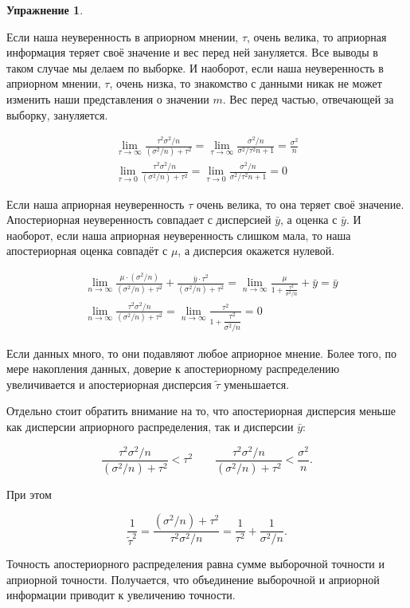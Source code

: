 \documentclass[12pt, a4paper, oneside]{extreport}
\theoremstyle{plain}              %
\theoremstyle{definition}         %
\newtheorem{problem}{\color{myblue} Упражнение}
\begin{document}
\begin{problem}
\begin{sol}
Если наша неуверенность в априорном мнении, $\tau$, очень велика, то априорная информация теряет своё значение и вес перед ней зануляется. Все выводы в таком случае мы делаем по выборке. И наоборот, если наша неуверенность в априорном мнении, $
\tau$, очень низка, то знакомство с данными никак не может изменить наши представления о значении $m$. Вес перед частью, отвечающей за выборку, зануляется.

\begin{align*}
\lim_{\tau \to \infty} \frac{\tau^2 \sigma^2/n}{(\sigma^2/n) + \tau^2} = \lim_{\tau \to \infty} \frac{\sigma^2/n}{\sigma^2/\tau^2 n + 1} = \frac{\sigma^2}{n} \\
\lim_{\tau \to 0} \frac{\tau^2 \sigma^2/n}{(\sigma^2/n) + \tau^2} = \lim_{\tau \to 0} \frac{\sigma^2/n}{\sigma^2/\tau^2 n + 1} = 0
\end{align*}

Если наша априорная неуверенность $\tau$ очень велика, то она теряет своё значение. Апостериорная неуверенность совпадает с дисперсией $\bar y$, а оценка с $\bar y$. И наоборот, если наша априорная неуверенность слишком мала, то наша апостериорная оценка совпадёт с $\mu$, а дисперсия окажется нулевой.

\begin{align*}
&\lim_{n \to \infty} \frac{\mu \cdot (\sigma^2/n)}{(\sigma^2/n) + \tau^2} + \frac{\bar y \cdot \tau^2}{(\sigma^2/n) + \tau^2} = \lim_{n \to \infty} \frac{\mu}{1 + \frac{\tau^2}{\sigma^2/n}} + \bar y = \bar y \\
&\lim_{n \to \infty} \frac{\tau^2 \sigma^2/n}{(\sigma^2/n) + \tau^2} = \lim_{n \to \infty} \frac{\tau^2}{1 + \dfrac{\tau^2}{\sigma^2/n}} = 0
\end{align*}

Если данных много, то они подавляют любое априорное мнение. Более того, по мере накопления данных, доверие к апостериорному распределению увеличивается и апостериорная дисперсия $\tilde \tau$  уменьшается. 

Отдельно стоит обратить внимание на то, что апостериорная дисперсия меньше как дисперсии априорного распределения, так и дисперсии $\bar y$: 

\[  \frac{\tau^2 \sigma^2/n}{(\sigma^2/n) + \tau^2} < \tau^2 \qquad \frac{\tau^2 \sigma^2/n}{(\sigma^2/n) + \tau^2} < \frac{\sigma^2}{n}. \] 

При этом 

\[ \frac{1}{\tilde{\tau}^2} = \frac{(\sigma^2/n) + \tau^2}{\tau^2 \sigma^2/n} = \frac{1}{\tau^2} + \frac{1}{\sigma^2/n}.\]

Точность апостериорного распределения равна сумме выборочной точности и априорной точности. Получается, что объединение выборочной и априорной информации приводит к увеличению точности. 
\end{sol}
\end{problem}
\end{document}
